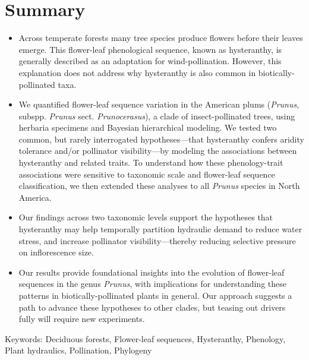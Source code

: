 \documentclass{article}[12pt]
\begin{document}
\section*{Summary} %
\begin{itemize}
\item Across temperate forests many tree species produce flowers before their leaves emerge. This flower-leaf phenological sequence, known as hysteranthy, is generally described as an adaptation for wind-pollination. However, this explanation does not address why hysteranthy is also common in biotically-pollinated taxa.

\item We quantified flower-leaf sequence variation in the American plums (\emph{Prunus}, subspp. \emph{Prunus} sect. \emph{Prunocerasus}), a clade of insect-pollinated trees, using herbaria specimens and Bayesian hierarchical modeling. We tested two common, but rarely interrogated hypotheses---that hysteranthy confers aridity tolerance and/or pollinator visibility---by modeling the associations between hysteranthy and related traits. To understand how these phenology-trait associations were sensitive to taxonomic scale and flower-leaf sequence classification, we then extended these analyses to all \emph{Prunus} species in North America. 

\item Our findings across two taxonomic levels support the hypotheses that hysteranthy may help temporally partition hydraulic demand to reduce water stress, and increase pollinator visibility---thereby reducing selective pressure on inflorescence size.


\item Our results provide foundational insights into the evolution of flower-leaf sequences in the genus \emph{Prunus}, with implications for understanding these patterns in biotically-pollinated plants in general. Our approach suggests a path to advance these hypotheses to other clades, but teasing out drivers fully will require new experiments.
\end{itemize}

Keywords: Deciduous forests, Flower-leaf sequences, Hysteranthy, Phenology, Plant hydraulics, Pollination, Phylogeny

\pagebreak
\end{document}

